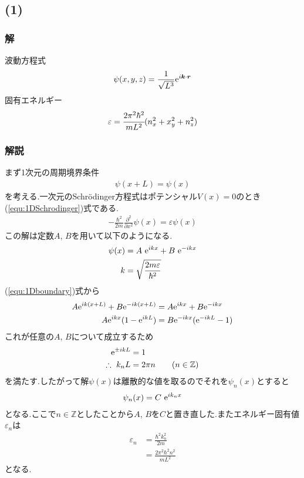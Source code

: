 \subsection*{(1)}
\subsubsection*{解}
波動方程式
\begin{align*}
  \psi(x,y,z)=\frac{1}{\sqrt{L^3}}{\rm e}^{i{\bm k}\cdot\bm{r}}
\end{align*}
固有エネルギー
\begin{align*}
  \varepsilon=\cfrac{2\pi^2\hbar^2}{mL^2}(n_x^2+x_y^2+n_z^2)
\end{align*}
\hrulefill
\subsubsection*{解説}
まず1次元の周期境界条件
\begin{align}
  \label{equ:1Dboundary}
  \psi(x+L)=\psi(x)
\end{align}
を考える.一次元のSchr\"{o}dinger方程式はポテンシャル$V(x)=0$のとき(\ref{equ:1DSchrodinger})式である.
\begin{align}
  \label{equ:1DSchrodinger}
  -\frac{\hbar^2}{2m}\frac{\partial^2}{\partial x^2}\psi(x)=\varepsilon\psi(x)
\end{align}
この解は定数$A$, $B$を用いて以下のようになる.
\begin{align}
  \psi(x)&=A\ {\rm e}^{ikx}+B\ {\rm e}^{-ikx}\\
  k&=\sqrt{\frac{2m\varepsilon}{\hbar^2}}
\end{align}
(\ref{equ:1Dboundary})式から
\begin{align}
  A{\rm e}^{ik(x+L)}+B{\rm e}^{-ik(x+L)}&=A{\rm e}^{ikx}+B{\rm e}^{-ikx}\\
  A{\rm e}^{ikx}(1-{\rm e}^{ikL})&=B{\rm e}^{-ikx}({\rm e}^{-ikL}-1)
\end{align}
これが任意の$A$, $B$について成立するため
\begin{align}
  {\rm e}^{\pm ikL}&=1\\
  \therefore\ k_nL&=2\pi n\qquad(n\in\mathbb{Z})
\end{align}
を満たす.したがって解$\psi(x)$は離散的な値を取るのでそれを$\psi_n(x)$とすると
\begin{align}
  \psi_n(x)=C\ {\rm e}^{ik_nx}
\end{align}
となる.ここで$n\in\mathbb{Z}$としたことから$A$, $B$を$C$と置き直した.またエネルギー固有値$\varepsilon_n$は
\begin{align}
  \label{equ:1Deigenvalue}
  \varepsilon_n&=\frac{\hbar^2k_n^2}{2m}\\
  &=\frac{2\pi^2\hbar^2n^2}{mL^2}
\end{align}
となる.

